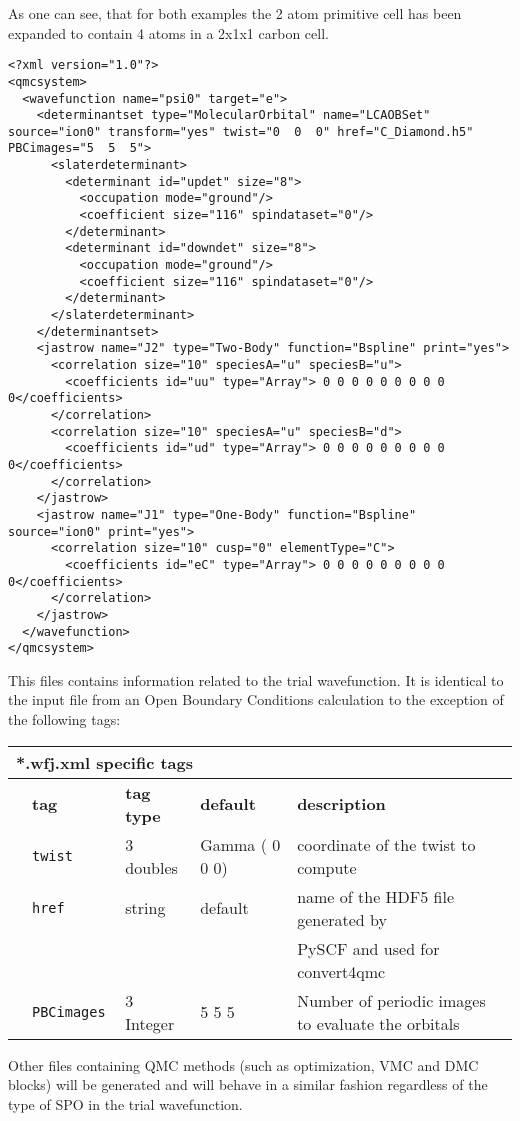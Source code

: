  As one can see, that for both examples the 2 atom primitive cell has been expanded to contain 4 atoms in a 2x1x1 carbon cell.
\begin{lstlisting}[style=QMCPXML,caption=CDiamond.wfj-Twist0.xml. This file contains the trial wavefunction.]
<?xml version="1.0"?>
<qmcsystem>
  <wavefunction name="psi0" target="e">
    <determinantset type="MolecularOrbital" name="LCAOBSet" source="ion0" transform="yes" twist="0  0  0" href="C_Diamond.h5" PBCimages="5  5  5">
      <slaterdeterminant>
        <determinant id="updet" size="8">
          <occupation mode="ground"/>
          <coefficient size="116" spindataset="0"/>
        </determinant>
        <determinant id="downdet" size="8">
          <occupation mode="ground"/>
          <coefficient size="116" spindataset="0"/>
        </determinant>
      </slaterdeterminant>
    </determinantset>
    <jastrow name="J2" type="Two-Body" function="Bspline" print="yes">
      <correlation size="10" speciesA="u" speciesB="u">
        <coefficients id="uu" type="Array"> 0 0 0 0 0 0 0 0 0 0</coefficients>
      </correlation>
      <correlation size="10" speciesA="u" speciesB="d">
        <coefficients id="ud" type="Array"> 0 0 0 0 0 0 0 0 0 0</coefficients>
      </correlation>
    </jastrow>
    <jastrow name="J1" type="One-Body" function="Bspline" source="ion0" print="yes">
      <correlation size="10" cusp="0" elementType="C">
        <coefficients id="eC" type="Array"> 0 0 0 0 0 0 0 0 0 0</coefficients>
      </correlation>
    </jastrow>
  </wavefunction>
</qmcsystem>
 \end{lstlisting}
This files contains information related to the trial wavefunction. It is identical to the input file from an Open Boundary Conditions calculation to the exception of the following tags:\\
\begin{table}[h]
\begin{center}
\begin{tabularx}{\textwidth}{l l l l l }
\hline
\multicolumn{5}{l}{*.wfj.xml specific tags} \\
\hline
   &   \bfseries tag     & \bfseries tag type & \bfseries default   & \bfseries description \\
   &   \texttt{twist             } &  3 doubles  & Gamma ( 0 0 0)& coordinate of the twist to compute\\
   &   \texttt{href             } &  string  & default& name of the HDF5 file generated by\\ 
   &                              &          &        &  PySCF and used for convert4qmc\\  
   &   \texttt{PBCimages            } &  3 Integer   & 5 5 5  & Number of periodic images to evaluate the orbitals\\
    \hline
    \end{tabularx}
\end{center}
\end{table}

Other files containing QMC methods (such as optimization, VMC and DMC blocks) will be generated and will behave in a similar fashion regardless of the type of SPO in the trial wavefunction. 




 

